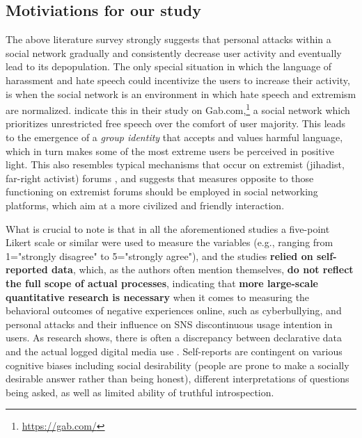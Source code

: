 \documentclass[a4paper,fleqn]{cas-dc}
\begin{document}
\subsection{Motiviations for our study}


The above literature survey strongly suggests that personal attacks within a social network gradually and consistently decrease user activity and eventually lead to its depopulation. The only special situation in which the language of harassment and hate speech could incentivize the users to increase their activity, is when the social network is an environment in which hate speech and extremism are normalized. \citet{mathew2019temporal} indicate this in their study on Gab.com,\footnote{\url{https://gab.com/}} a social network which prioritizes unrestricted free speech over the comfort of user majority.
This leads to the emergence of a \textit{group identity} that accepts and values harmful language, which in turn makes some of the most extreme users be perceived in positive light. This also resembles typical mechanisms that occur on extremist (jihadist, far-right activist) forums \citep{de2008stormfront, chua2019understanding}, and suggests that measures opposite to those functioning on extremist forums should be employed in social networking platforms, which aim at a more civilized and friendly interaction.



What is crucial to note is that in all the aforementioned studies a five-point Likert scale or similar were used to measure the variables (e.g., ranging from 1="strongly disagree" to 5="strongly agree"), and the studies \textbf{relied on self-reported data}, which, as the authors often mention themselves, \textbf{do not reflect the full scope of actual processes}, indicating that \textbf{more large-scale quantitative research is necessary} when it comes to measuring the behavioral outcomes of negative experiences online, such as cyberbullying, and personal attacks and their influence on SNS discontinuous usage intention in users.
As research shows, there is often a discrepancy between declarative data and the actual logged digital media use \citep{Parry2021discrepancies, Ellis2019smartphoneScales}.  Self-reports are contingent on various cognitive biases including social desirability (people are prone to make a socially desirable answer rather than being honest), different interpretations of questions being asked, as well as limited ability of truthful introspection.
\end{document}
